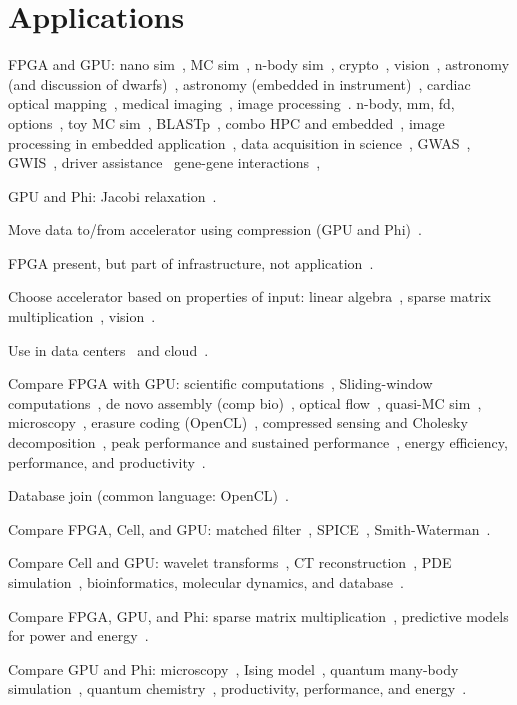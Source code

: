 \section{Applications}
\label{sec:apps}

FPGA and GPU:
nano sim~\cite{khdo06},
MC sim~\cite{shsc08,tttl10},
n-body sim~\cite{tl10},
crypto~\cite{dfg+13,kl10},
vision~\cite{bkdb10,brf14,ghgb11},
astronomy (and discussion of dwarfs)~\cite{ibs12},
astronomy (embedded in instrument)~\cite{kgb+14},
cardiac optical mapping~\cite{mjk12},
medical imaging~\cite{szb+12,sll13},
image processing~\cite{dbd+13}.
n-body, mm, fd, options~\cite{whk+13},
toy MC sim~\cite{admb14},
BLASTp~\cite{Papad14},
combo HPC and embedded~\cite{rpm+15},
image processing in embedded application~\cite{enr+18,nsg+16,zxl+18},
data acquisition in science~\cite{cab+17,vac+16},
GWAS~\cite{kws+16},
GWIS~\cite{wkhe17},
driver assistance~\cite{wlhk17}
gene-gene interactions~\cite{wkhe18},

GPU and Phi:
Jacobi relaxation~\cite{cv16}.

Move data to/from accelerator using compression (GPU and Phi)~\cite{bkp15}.

FPGA present, but part of infrastructure, not application~\cite{abb+13}.

Choose accelerator based on properties of input:
linear algebra~\cite{gchg16,sll+13},
sparse matrix multiplication~\cite{gsbh16},
vision~\cite{mfo+16}.

Use in data centers~\cite{fds+17} and cloud~\cite{sm16}.

Compare FPGA with GPU:
scientific computations~\cite{wghp11},
Sliding-window computations~\cite{cfbs15},
de novo assembly (comp bio)~\cite{mjk+16},
optical flow~\cite{bnw+10}, quasi-MC sim~\cite{tb10},
microscopy~\cite{tzwz15}, erasure coding (OpenCL)~\cite{czs+16},
compressed sensing and Cholesky decomposition~\cite{ypl12},
peak performance and sustained performance~\cite{vn14},
energy efficiency, performance, and productivity~\cite{cdde13}.

Database join (common language: OpenCL)~\cite{rl17}.

Compare FPGA, Cell, and GPU:
matched filter~\cite{bgt07}, SPICE~\cite{kd09}, Smith-Waterman~\cite{bal+12}.

Compare Cell and GPU:
wavelet transforms~\cite{bck+11}, CT reconstruction~\cite{skkh07},
PDE simulation~\cite{rd10},
bioinformatics, molecular dynamics, and database~\cite{pts+12}.

Compare FPGA, GPU, and Phi:
sparse matrix multiplication~\cite{gsbh16},
predictive models for power and energy~\cite{opr+17}.

Compare GPU and Phi:
microscopy~\cite{tkk+14}, Ising model~\cite{ws13},
quantum many-body simulation~\cite{Lyakh15},
quantum chemistry~\cite{lrg14},
productivity, performance, and energy~\cite{mlp+17}.
